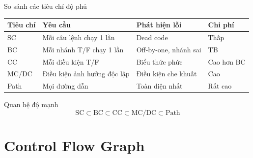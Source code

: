 \documentclass[aspectratio=169,12pt]{beamer}
\begin{document}
\begin{frame}{So sánh các tiêu chí độ phủ}
  \large
  \renewcommand{\arraystretch}{1.18}
  \begin{tabularx}{\textwidth}{lXXl}
    \toprule
    \textbf{Tiêu chí} & \textbf{Yêu cầu} & \textbf{Phát hiện lỗi} & \textbf{Chi phí} \\
    \midrule
    SC & Mỗi câu lệnh chạy 1 lần & Dead code & Thấp \\
    BC & Mỗi nhánh T/F chạy 1 lần & Off-by-one, nhánh sai & TB \\
    CC & Mỗi điều kiện T/F & Biểu thức phức & Cao hơn BC \\
    MC/DC & Điều kiện ảnh hưởng độc lập & Điều kiện che khuất & Cao \\
    Path & Mọi đường dẫn & Toàn diện nhất & Rất cao \\
    \bottomrule
  \end{tabularx}
  \renewcommand{\arraystretch}{1}

  \vspace{0.5em}
  \begin{block}{Quan hệ độ mạnh}
    \Large
    \[
      \text{SC} \subset \text{BC} \subset \text{CC} \subset \text{MC/DC} \subset \text{Path}
    \]
  \end{block}
\end{frame}

\section{Control Flow Graph}
\end{document}
